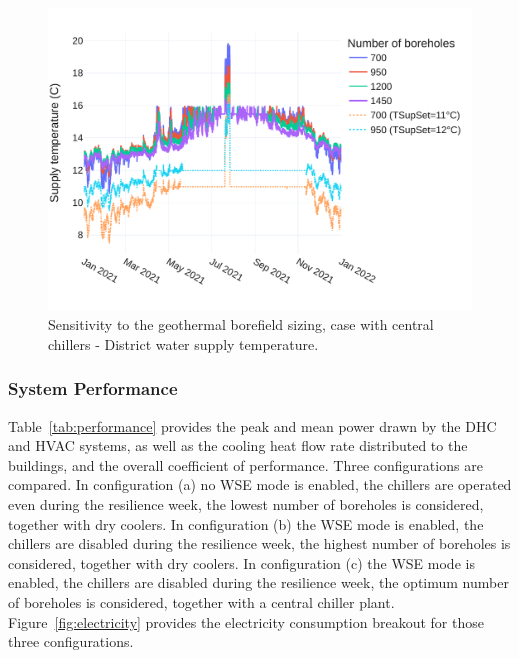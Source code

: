 \begin{figure}[!htbp]
    \centering
    \includegraphics[width=.7\linewidth]{../python_scripts/figures/GeoSizing_chillers.pdf}
    \caption{Sensitivity to the geothermal borefield sizing, case with central chillers - District water supply temperature.}
    \label{fig:chillers_tsup}
\end{figure}




\subsubsection{System Performance} \label{sec:performance}

Table~\ref{tab:performance} provides the peak and mean power drawn by the DHC and HVAC systems, as well as the cooling heat flow rate distributed to the buildings, and the overall coefficient of performance.
Three configurations are compared. In configuration (a) no WSE mode is enabled, the chillers are operated even during the resilience week, the lowest number of boreholes is considered, together with dry coolers. In configuration (b) the WSE mode is enabled, the chillers are disabled during the resilience week, the highest number of boreholes is considered, together with dry coolers. In configuration (c) the WSE mode is enabled, the chillers are disabled during the resilience week, the optimum number of boreholes is considered, together with a central chiller plant.
Figure~\ref{fig:electricity} provides the electricity consumption breakout for those three configurations.

